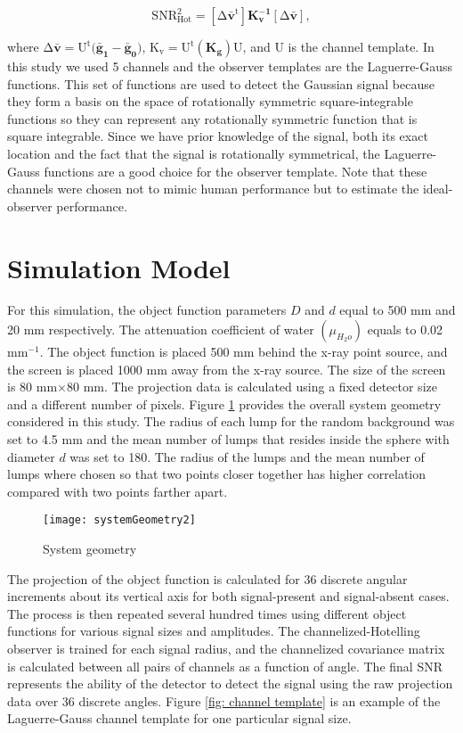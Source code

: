 \begin{equation}
\label{SNR hot}
\mathrm{SNR^2_{Hot} = [\Delta \mathbf{\bar{v}}^t]\mathbf{K_v^{-1}}[\Delta \mathbf{\bar{v}}]},
\end{equation}

\noindent
where $\mathrm{\Delta \mathbf{\bar{v}} = U^t(\mathbf{\bar{g}_1}-\mathbf{\bar{g}_0)}}$, $\mathrm{K_v= U^t(\mathbf{K_g})U}$, and $\mathrm{U}$ is the channel template.  In this study we used 5 channels and the observer templates are the Laguerre-Gauss functions.  This set of functions are used to detect the Gaussian signal because they form a basis on the space of rotationally symmetric square-integrable functions so they can represent any rotationally symmetric function that is square integrable.  Since we have prior knowledge of the signal, both its exact location and the fact that the signal is rotationally symmetrical, the Laguerre-Gauss functions are a good choice for the observer template.  Note that these channels were chosen not to mimic human performance but to estimate the ideal-observer performance.

\section{Simulation Model}
For this simulation, the object function parameters $D$ and $d$ equal to 500 mm and 20 mm respectively.  The attenuation coefficient of water $(\mu_{H_2o})$ equals to 0.02 mm$^{-1}$.  The object function is placed 500 mm behind the x-ray point source, and the screen is placed 1000 mm away from the x-ray source.  The size of the screen is 80 mm$\times$80 mm.  The projection data is calculated using a fixed detector size and a different number of pixels.  Figure \ref{fig:system geometry} provides the overall system geometry considered in this study.  The radius of each lump for the random background was set to 4.5 mm and the mean number of lumps that resides inside the sphere with diameter $d$ was set to 180.  The radius of the lumps and the mean number of lumps where chosen so that two points closer together has higher correlation compared with two points farther apart.

\begin{figure}
\texttt{[image: systemGeometry2]}
\caption{System geometry}
\label{fig:system geometry}
\end{figure} 

\noindent
The projection of the object function is calculated for 36 discrete angular increments about its vertical axis for both signal-present and signal-absent cases.  The process is then repeated several hundred times using different object functions for various signal sizes and amplitudes.  The channelized-Hotelling observer is trained for each signal radius, and the channelized covariance matrix is calculated between all pairs of channels as a function of angle.  The final SNR represents the ability of the detector to detect the signal using the raw projection data over 36 discrete angles.  Figure \ref{fig: channel template} is an example of the Laguerre-Gauss channel template for one particular signal size.

